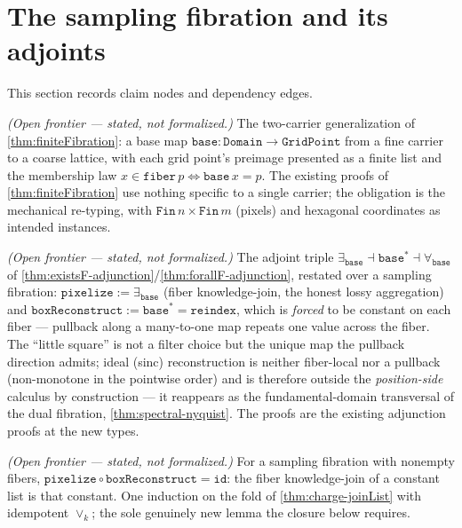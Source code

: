 \section{The sampling fibration and its adjoints}

This section records claim nodes and dependency edges.

\begin{proposition}\label{thm:sampling-fibration}\notready{}
\emph{(Open frontier --- stated, not formalized.)} The two-carrier generalization of
\cref{thm:finiteFibration}: a base map $\texttt{base} : \texttt{Domain} \to
\texttt{GridPoint}$ from a fine carrier to a coarse lattice, with each grid point's
preimage presented as a finite list and the membership law $x \in
\texttt{fiber}\,p \iff \texttt{base}\,x = p$. The existing proofs of
\cref{thm:finiteFibration} use nothing specific to a single carrier; the obligation is
the mechanical re-typing, with $\texttt{Fin}\,n \times \texttt{Fin}\,m$ (pixels) and
hexagonal coordinates as intended instances.
\end{proposition}

\begin{theorem}\label{thm:pixelize-adjoint-triple}\notready{}
\emph{(Open frontier --- stated, not formalized.)} The adjoint triple $\exists_{\texttt{base}}
\dashv \texttt{base}^{*} \dashv \forall_{\texttt{base}}$ of
\cref{thm:existsF-adjunction}/\cref{thm:forallF-adjunction}, restated over a sampling
fibration: $\texttt{pixelize} := \exists_{\texttt{base}}$ (fiber knowledge-join, the
honest lossy aggregation) and $\texttt{boxReconstruct} := \texttt{base}^{*} =
\texttt{reindex}$, which is \emph{forced} to be constant on each fiber --- pullback along
a many-to-one map repeats one value across the fiber. The ``little square'' is not a
filter choice but the unique map the pullback direction admits; ideal (sinc)
reconstruction is neither fiber-local nor a pullback (non-monotone in the pointwise
order) and is therefore outside the \emph{position-side} calculus by construction ---
it reappears as the fundamental-domain transversal of the dual fibration,
\cref{thm:spectral-nyquist}. The proofs are the existing adjunction proofs at the new
types.
\end{theorem}

\begin{proposition}\label{thm:sample-reconstruct-id}\notready{}
\emph{(Open frontier --- stated, not formalized.)} For a sampling fibration with nonempty
fibers, $\texttt{pixelize} \circ \texttt{boxReconstruct} = \texttt{id}$: the fiber
knowledge-join of a constant list is that constant. One induction on the fold of
\cref{thm:charge-joinList} with idempotent $\vee_k$; the sole genuinely new lemma the
closure below requires.
\end{proposition}
